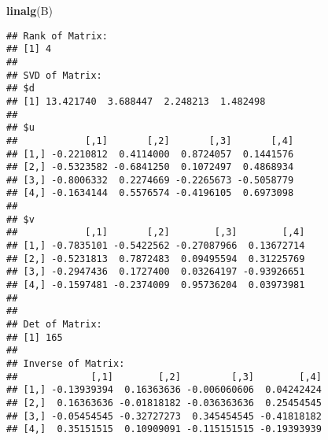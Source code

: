 \documentclass[
]{article}
\newenvironment{Shaded}{\begin{snugshade}}{\end{snugshade}}
\newcommand{\FunctionTok}[1]{\textcolor[rgb]{0.13,0.29,0.53}{\textbf{#1}}}
\newcommand{\NormalTok}[1]{#1}
\begin{document}
\begin{Shaded}
\begin{Highlighting}[]
\FunctionTok{linalg}\NormalTok{(B)}
\end{Highlighting}
\end{Shaded}

\begin{verbatim}
## Rank of Matrix:
## [1] 4
## 
## SVD of Matrix:
## $d
## [1] 13.421740  3.688447  2.248213  1.482498
## 
## $u
##            [,1]       [,2]       [,3]       [,4]
## [1,] -0.2210812  0.4114000  0.8724057  0.1441576
## [2,] -0.5323582 -0.6841250  0.1072497  0.4868934
## [3,] -0.8006332  0.2274669 -0.2265673 -0.5058779
## [4,] -0.1634144  0.5576574 -0.4196105  0.6973098
## 
## $v
##            [,1]       [,2]        [,3]        [,4]
## [1,] -0.7835101 -0.5422562 -0.27087966  0.13672714
## [2,] -0.5231813  0.7872483  0.09495594  0.31225769
## [3,] -0.2947436  0.1727400  0.03264197 -0.93926651
## [4,] -0.1597481 -0.2374009  0.95736204  0.03973981
## 
## 
## Det of Matrix:
## [1] 165
## 
## Inverse of Matrix:
##             [,1]        [,2]         [,3]        [,4]
## [1,] -0.13939394  0.16363636 -0.006060606  0.04242424
## [2,]  0.16363636 -0.01818182 -0.036363636  0.25454545
## [3,] -0.05454545 -0.32727273  0.345454545 -0.41818182
## [4,]  0.35151515  0.10909091 -0.115151515 -0.19393939
\end{verbatim}
\end{document}
